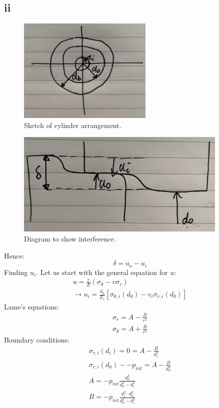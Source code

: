 \documentclass[11pt]{article}
\numberwithin{equation}{section}
\begin{document}
\subsection{ii}
\begin{figure}[H]
    \centering
    \includegraphics[height =5cm]{./img/q2i2.jpg}
    \caption{Sketch of cylinder arrangement.}
\end{figure}
\begin{figure}[H]
    \centering
    \includegraphics[height =5cm]{./img/q2i1.jpg}
    \caption{Diagram to show interference.}
\end{figure}
Hence:
\begin{equation}
    \delta = u_o - u_i
\end{equation}
Finding $u_i$. Let us start with the general equation for $u$:
\begin{gather}
    u = \frac{r}{E}\left(\sigma_{\theta} - v \sigma_r\right)\\
    \rightarrow u_i = \frac{d_0}{E_i}\left[\sigma_{\theta, i} \left(d_0\right) - v_i \sigma_{r,i} (d_0)\right]
\end{gather}
Lame's equations:
\begin{gather}
    \sigma_r = A - \frac{B}{r^2}\\
    \sigma_{\theta} = A + \frac{B}{r^2}
\end{gather}
Boundary conditions:
\begin{gather}
    \sigma_{r,i}(d_i) = 0 = A - \frac{B}{d_i^2}\\
    \sigma_{r,i}(d_0) - -p_{int} = A - \frac{B}{d_0^2}\\
    A = -p_{int}\frac{d_0^2}{d_0^2 - d_i^2}\\
    B = -p_{int}\frac{d_i^2 \cdot d_0^2}{d_0^2 - d_i^2}
\end{gather}
\end{document}
